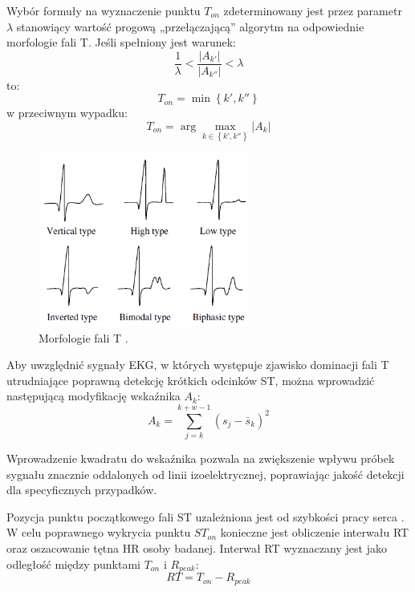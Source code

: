 Wybór formuły na wyznaczenie punktu $ T_{on} $ zdeterminowany jest przez parametr $ \lambda $ stanowiący wartość progową „przełączającą” algorytm na odpowiednie morfologie fali T. Jeśli spełniony jest warunek:
\begin{equation}
	\frac{1}{\lambda} < \frac{\left| A_{k'} \right| }{\left| A_{k''} \right| } < \lambda
\end{equation}
to:
\begin{equation}
	T_{on} = \min \left\lbrace k', k'' \right\rbrace 
\end{equation}
w przeciwnym wypadku:
\begin{equation}
	T_{on} = \arg \max_{k \in \left\lbrace k', k'' \right\rbrace } \left| A_k \right| 
\end{equation}
\begin{figure}[H]
	\centering
	\includegraphics[width=0.62\textwidth]{ST_INTERVAL/img/ST_morfologieT.png}
	\caption{Morfologie fali T \cite{STInt1}.}
	\label{fig:ST_morfologieT}
\end{figure}
Aby uwzględnić sygnały EKG, w których występuje zjawisko dominacji fali T utrudniające poprawną detekcję krótkich odcinków ST, można wprowadzić następującą modyfikację wskaźnika $ A_k $:
\begin{equation}
	A_k = \sum_{j=k}^{k+w-1} \left( s_j-\bar{s}_k \right)^2
\end{equation}

Wprowadzenie kwadratu do wskaźnika pozwala na zwiększenie wpływu próbek sygnału znacznie oddalonych od linii izoelektrycznej, poprawiając jakość detekcji dla specyficznych przypadków.

Pozycja punktu początkowego fali ST uzależniona jest od szybkości pracy serca \cite{STInt1}. W celu poprawnego wykrycia punktu $ ST_{on} $ konieczne jest obliczenie interwału RT oraz oszacowanie tętna HR osoby badanej. Interwał RT wyznaczany jest jako odległość między punktami $ T_{on} $ i $ R_{peak} $:
\begin{equation}
	RT = T_{on} - R_{peak}
\end{equation}

